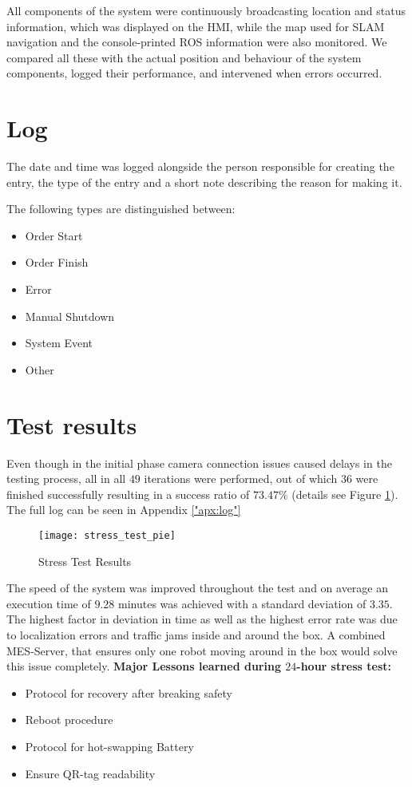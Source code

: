 All components of the system were continuously broadcasting location and status information, which was displayed on the HMI, while the map used for SLAM navigation and the console-printed ROS information were also monitored. We compared all these with the actual position and behaviour of the system components, logged their performance, and intervened when errors occurred. 

\section{Log}
The date and time was logged alongside the person responsible for creating the entry, the type of the entry and a short note describing the reason for making it.

The following types are distinguished between:

\begin{itemize}
	\item Order Start
	\item Order Finish
	\item Error
	\item Manual Shutdown
	\item System Event
	\item Other
\end{itemize}

\section{Test results}
Even though in the initial phase camera connection issues caused delays in the testing process, all in all $49$ iterations were performed, out of which $36$ were finished successfully resulting in a success ratio of $73.47\%$ (details see Figure \ref{fig:order_statistics}). The full log can be seen in Appendix \ref{"apx:log"}

\begin{figure}[H]
	\centering
	\texttt{[image: stress\_test\_pie]}
	\caption{Stress Test Results}
	\label{fig:order_statistics}
\end{figure}

The speed of the system was improved throughout the test and on average an execution time of $9.28$ minutes was achieved with a standard deviation of $3.35$. The highest factor in deviation in time as well as the highest error rate was due to localization errors and traffic jams inside and around the box. A combined MES-Server, that ensures only one robot moving around in the box would solve this issue completely. 
\newpage
\textbf{Major Lessons learned during $24$-hour stress test:}
\begin{itemize}
\item Protocol for recovery after breaking safety
\item Reboot procedure
\item Protocol for hot-swapping Battery
\item Ensure QR-tag readability
\end{itemize}

